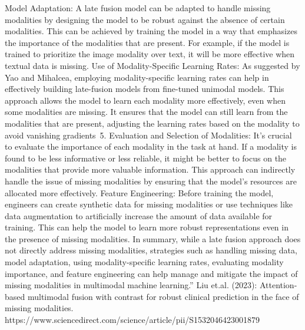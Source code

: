 \documentclass{article}%
\begin{document}
\newline%
\newline%
%
Model Adaptation: A late fusion model can be adapted to handle missing modalities by designing the model to be robust against the absence of certain modalities. This can be achieved by training the model in a way that emphasizes the importance of the modalities that are present. For example, if the model is trained to prioritize the image modality over text, it will be more effective when textual data is missing.%
\newline%
\newline%
%
Use of Modality{-}Specific Learning Rates: As suggested by Yao and Mihalcea, employing modality{-}specific learning rates can help in effectively building late{-}fusion models from fine{-}tuned unimodal models. This approach allows the model to learn each modality more effectively, even when some modalities are missing. It ensures that the model can still learn from the modalities that are present, adjusting the learning rates based on the modality to avoid vanishing gradients~5.%
\newline%
\newline%
%
Evaluation and Selection of Modalities: It's crucial to evaluate the importance of each modality in the task at hand. If a modality is found to be less informative or less reliable, it might be better to focus on the modalities that provide more valuable information. This approach can indirectly handle the issue of missing modalities by ensuring that the model's resources are allocated more effectively.%
\newline%
\newline%
%
Feature Engineering: Before training the model, engineers can create synthetic data for missing modalities or use techniques like data augmentation to artificially increase the amount of data available for training. This can help the model to learn more robust representations even in the presence of missing modalities.%
\newline%
\newline%
%
In summary, while a late fusion approach does not directly address missing modalities, strategies such as handling missing data, model adaptation, using modality{-}specific learning rates, evaluating modality importance, and feature engineering can help manage and mitigate the impact of missing modalities in multimodal machine learning.”%
\newline%
\newline%
%
Liu et.al. (2023): Attention{-}based multimodal fusion with contrast for robust clinical prediction in the face of missing modalities. %
\newline%
\newline%
%
https://www.sciencedirect.com/science/article/pii/S1532046423001879%
\newline%
\newline%
%
%
\newline%
\newline%
%
%
\newline%
\newline%
%
\end{document}
